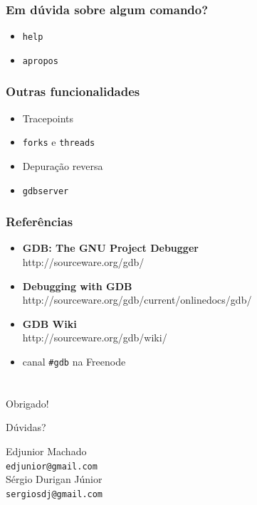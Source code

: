 \documentclass[xcolor=pdftex,dvipsnames,table,t]{beamer}
\begin{document}
\begin{frame}
	\frametitle{Em dúvida sobre algum comando?}
	  \begin{itemize}
	    \item \texttt{help}
	    \item \texttt{apropos}
	  \end{itemize}
\end{frame}

\begin{frame}
	\frametitle{Outras funcionalidades}
	  \begin{itemize}
	    \item Tracepoints
	    \item \texttt{forks} e \texttt{threads}
	    \item Depuração reversa
	    \item \texttt{gdbserver}
	  \end{itemize}
\end{frame}

\begin{frame}
       \frametitle{Referências}
        \begin{center}
        \begin{itemize}
		\item \textbf{GDB: The GNU Project Debugger} \\
		http://sourceware.org/gdb/
		\item \textbf{Debugging with GDB} \\
		http://sourceware.org/gdb/current/onlinedocs/gdb/
		\item \textbf{GDB Wiki} \\
		http://sourceware.org/gdb/wiki/
		\item canal \texttt{\#gdb} na Freenode
	\end{itemize}
        \end{center}
\end{frame}

\section{}
\begin{frame}
	\begin{center}
	\LARGE
	\alert{Obrigado!}

	Dúvidas?


	\vspace{2\baselineskip}

	\small
	Edjunior Machado \\
	{\tt edjunior@gmail.com} \\
	\vspace{1\baselineskip}
	Sérgio Durigan Júnior \\
	{\tt sergiosdj@gmail.com}
	\end{center}
\end{frame}
\end{document}
